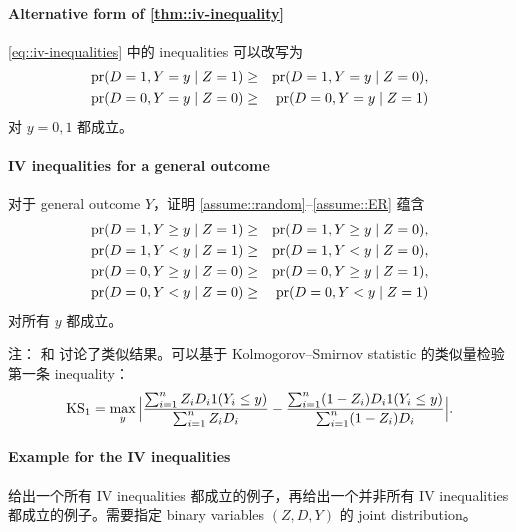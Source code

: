  





\paragraph{Alternative form of \cref{thm::iv-inequality}}
\label{hw::ivineq-binary}

\cref{eq::iv-inequalities} 中的 inequalities 可以改写为
\begin{eqnarray*}
\textup{pr}(D=1, Y=y\mid Z=1) &\geq & \textup{pr}(D=1, Y=y\mid Z=0), \\
\textup{pr}(D=0, Y=y\mid Z=0) &\geq & \textup{pr}(D=0, Y=y\mid Z=1)
\end{eqnarray*}
对 $y=0,1$ 都成立。



\paragraph{IV inequalities for a general outcome}
\label{hw::ivineq-general-Y}

对于 general outcome $Y$，证明 \cref{assume::random}--\cref{assume::ER} 蕴含
\begin{eqnarray*}
\textup{pr}(D=1, Y\geq y\mid Z=1) &\geq & \textup{pr}(D=1, Y\geq y\mid Z=0), \\
\textup{pr}(D=1, Y <  y\mid Z=1) &\geq & \textup{pr}(D=1, Y <  y\mid Z=0), \\
\textup{pr}(D=0, Y\geq y\mid Z=0) &\geq & \textup{pr}(D=0, Y\geq y\mid Z=1),\\
\textup{pr}(D=0, Y <  y\mid Z=0) &\geq & \textup{pr}(D=0, Y <  y\mid Z=1)
\end{eqnarray*}
对所有 $y$ 都成立。
 
注：\citet{imbens1997estimating} 和 \citet{kitagawa2015test} 讨论了类似结果。可以基于 Kolmogorov--Smirnov statistic 的类似量检验第一条 inequality：
$$
\text{KS}_1 = \max_{y} \Big |
\frac{  \sum_{i=1}^n Z_i D_i  1(Y_i \leq y)  }{ \sum_{i=1}^n Z_i D_i  } - \frac{  \sum_{i=1}^n (1-Z_i) D_i  1(Y_i \leq y)  }{ \sum_{i=1}^n (1-Z_i) D_i  }
\Big |.
$$



\paragraph{Example for the IV inequalities}

给出一个所有 IV inequalities 都成立的例子，再给出一个并非所有 IV inequalities 都成立的例子。需要指定 binary variables $(Z,D,Y)$ 的 joint distribution。

 
 
